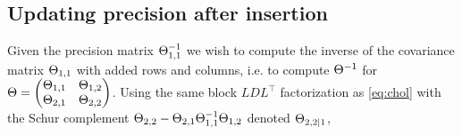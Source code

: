 \documentclass[review,supplement,onefignum,onetabnum]{siamonline220329}
\begin{document}
\subsection{Updating precision after insertion}
\label{app:prec_insert}

Given the precision matrix \( \Theta_{1, 1}^{-1} \) we wish to
compute the inverse of the covariance matrix \( \Theta_{1, 1} \)
with added rows and columns, i.e. to compute \( \Theta^{-1} \) for
\(
  \Theta =
    \begin{pmatrix}
      \Theta_{1, 1} & \Theta_{1, 2} \\
      \Theta_{2, 1} & \Theta_{2, 2}
    \end{pmatrix}
\).
Using the same block \( L D L^{\top} \) factorization as \cref{eq:chol} with
the Schur complement \textcolor{lightblue}{\( \Theta_{2, 2} - \Theta_{2, 1} \Theta_{1,
1}^{-1} \Theta_{1, 2} \)} denoted \textcolor{lightblue}{\( \Theta_{2, 2 \mid 1} \)},
\end{document}

